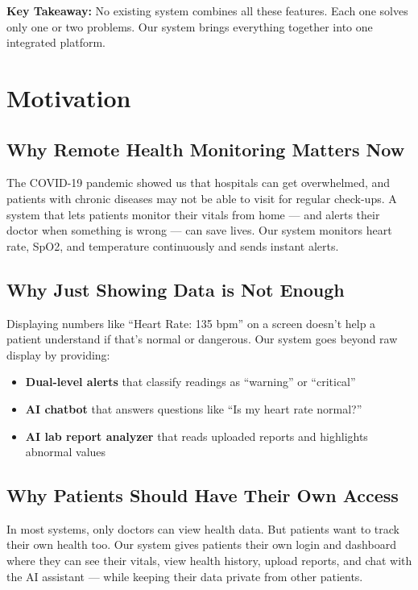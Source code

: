 \documentclass[12pt,a4paper]{article}
\begin{document}
\noindent \textbf{Key Takeaway:} No existing system combines all these features. Each one solves only one or two problems. Our system brings everything together into one integrated platform.

\section{Motivation}

\subsection{Why Remote Health Monitoring Matters Now}
The COVID-19 pandemic showed us that hospitals can get overwhelmed, and patients with chronic diseases may not be able to visit for regular check-ups. A system that lets patients monitor their vitals from home --- and alerts their doctor when something is wrong --- can save lives. Our system monitors heart rate, SpO2, and temperature continuously and sends instant alerts.

\subsection{Why Just Showing Data is Not Enough}
Displaying numbers like ``Heart Rate: 135 bpm'' on a screen doesn't help a patient understand if that's normal or dangerous. Our system goes beyond raw display by providing:
\begin{itemize}[leftmargin=*]
    \item \textbf{Dual-level alerts} that classify readings as ``warning'' or ``critical''
    \item \textbf{AI chatbot} that answers questions like ``Is my heart rate normal?''
    \item \textbf{AI lab report analyzer} that reads uploaded reports and highlights abnormal values
\end{itemize}

\subsection{Why Patients Should Have Their Own Access}
In most systems, only doctors can view health data. But patients want to track their own health too. Our system gives patients their own login and dashboard where they can see their vitals, view health history, upload reports, and chat with the AI assistant --- while keeping their data private from other patients.
\end{document}
